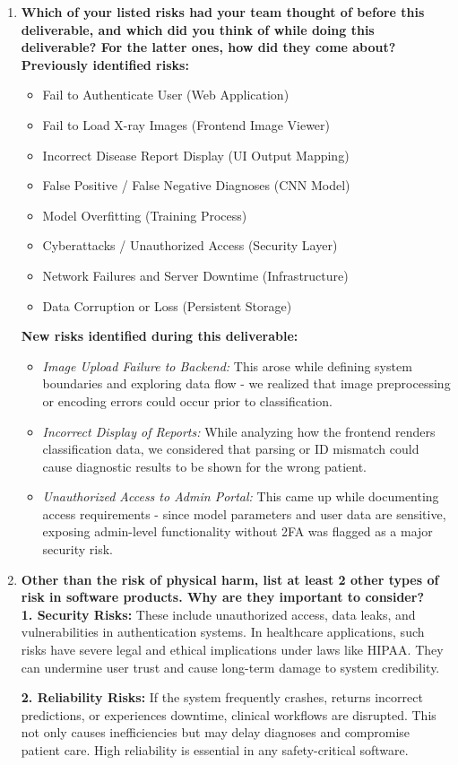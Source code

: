 \documentclass{article}
\begin{document}
\begin{enumerate}
  \item \textbf{Which of your listed risks had your team thought of before this deliverable, and which did you think of while doing this deliverable? For the latter ones, how did they come about?}\\
  \textbf{Previously identified risks:}
  \begin{itemize}
    \item Fail to Authenticate User (Web Application)
    \item Fail to Load X-ray Images (Frontend Image Viewer)
    \item Incorrect Disease Report Display (UI Output Mapping)
    \item False Positive / False Negative Diagnoses (CNN Model)
    \item Model Overfitting (Training Process)
    \item Cyberattacks / Unauthorized Access (Security Layer)
    \item Network Failures and Server Downtime (Infrastructure)
    \item Data Corruption or Loss (Persistent Storage)
  \end{itemize}
  \textbf{New risks identified during this deliverable:}
  \begin{itemize}
    \item \textit{Image Upload Failure to Backend:} This arose while defining system boundaries and exploring data flow - we realized that image preprocessing or encoding errors could occur prior to classification.
    \item \textit{Incorrect Display of Reports:} While analyzing how the frontend renders classification data, we considered that parsing or ID mismatch could cause diagnostic results to be shown for the wrong patient.
    \item \textit{Unauthorized Access to Admin Portal:} This came up while documenting access requirements - since model parameters and user data are sensitive, exposing admin-level functionality without 2FA was flagged as a major security risk.
  \end{itemize}

  \item \textbf{Other than the risk of physical harm, list at least 2 other types of risk in software products. Why are they important to consider?}\\
  \textbf{1. Security Risks:} These include unauthorized access, data leaks, and vulnerabilities in authentication systems. In healthcare applications, such risks have severe legal and ethical implications under laws like HIPAA. They can undermine user trust and cause long-term damage to system credibility.

  \textbf{2. Reliability Risks:} If the system frequently crashes, returns incorrect predictions, or experiences downtime, clinical workflows are disrupted. This not only causes inefficiencies but may delay diagnoses and compromise patient care. High reliability is essential in any safety-critical software.
\end{enumerate}
\end{document}
